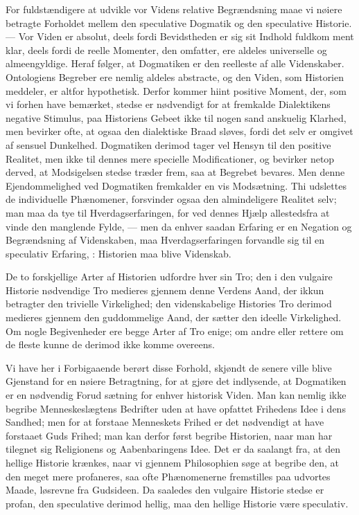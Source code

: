 \documentclass[12pt]{book}
\newcommand{\dsi}{\reflectbox{c}:}
\newcommand{\opage}[1]{\marginnote{\footnotesize\textit{[#1]}}}
\begin{document}
For fuldstændigere at udvikle vor Videns relative Begrændsning maae vi nøiere
betragte Forholdet mellem den speculative Dogmatik og den speculative Historie.
--- Vor Viden er absolut, deels fordi Bevidstheden er sig sit Indhold fuldkom\-%
\opage{52}ment klar, deels fordi de reelle Momenter, den omfatter, ere aldeles universelle
og almeengyldige. Heraf følger, at Dogmatiken er den reelleste af alle
Videnskaber. Ontologiens Begreber ere nemlig aldeles abstracte, og den Viden, som
Historien meddeler, er altfor hypothetisk. Derfor kommer hiint positive Moment,
der, som vi forhen have bemærket, stedse er nødvendigt for at fremkalde
Dialektikens negative Stimulus, paa Historiens Gebeet ikke til nogen sand
anskuelig Klarhed, men bevirker ofte, at ogsaa den dialektiske Braad sløves,
fordi det selv er omgivet af sensuel Dunkelhed. Dogmatiken derimod tager vel
Hensyn til den positive Realitet, men ikke til dennes mere specielle
Modificationer, og bevirker netop derved, at Modsigelsen stedse træder frem, saa
at Begrebet bevares. Men denne Ejendommelighed ved Dogmatiken fremkalder en vis
Modsætning. Thi udslettes de individuelle Phænomener, forsvinder ogsaa den
almindeligere Realitet selv; man maa da tye til Hverdagserfaringen, for ved
dennes Hjælp allestedsfra at vinde den manglende Fylde, --- men da enhver saadan
Erfaring er en Negation og Begrændsning af Videnskaben, maa Hverdagserfaringen
forvandle sig til en speculativ Erfaring, \dsi{} Historien maa blive Videnskab.

De to forskjellige Arter af Historien udfordre hver sin Tro; den i den vulgaire
Historie nødvendige Tro medieres gjennem denne Verdens Aand, der ikkun betragter
den trivielle Virkelighed; den videnskabelige Histories Tro derimod medieres
gjennem den guddommelige Aand, der sætter den ideelle Virkelighed. Om nogle
Begivenheder ere begge Arter af Tro enige; om andre eller rettere om de fleste
kunne de derimod ikke komme overeens.

Vi have her i Forbigaaende berørt disse Forhold, skjøndt de senere ville blive
Gjenstand for en nøiere Betragtning, for at gjøre det indlysende, at Dogmatiken
er en nødvendig Forud\-%
\opage{53}sætning for enhver historisk Viden. Man kan nemlig ikke begribe Menneskeslægtens
Bedrifter uden at have opfattet Frihedens Idee i dens Sandhed; men for at forstaae
Menneskets Frihed er det nødvendigt at have forstaaet Guds Frihed; man kan derfor
først begribe Historien, naar man har tilegnet sig Religionens og Aabenbaringens
Idee. Det er da saalangt fra, at den hellige Historie krænkes, naar vi gjennem
Philosophien søge at begribe den, at den meget mere profaneres, saa ofte
Phænomenerne fremstilles paa udvortes Maade, løsrevne fra Gudsideen. Da saaledes
den vulgaire Historie stedse er profan, den speculative derimod hellig, maa den
hellige Historie være speculativ.
\end{document}
